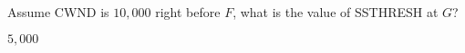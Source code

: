 \documentclass{supervision}
\begin{document}
\begin{questions}
\begin{parts}
\begin{subparts}
\begin{solution}
\begin{enumerate}[label=(\alph*)]
                \end{enumerate}
              \end{solution}

            \subpart Assume CWND is $10,000$ right before $F$, what is the value
              of SSTHRESH at $G$?
              \begin{solution}
                $5,000$
              \end{solution}

          \end{subparts}
      \end{parts}
  \end{questions}
\end{document}

